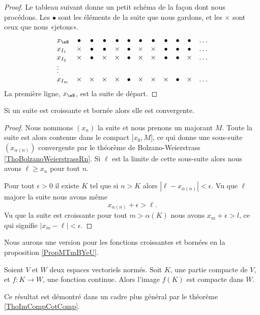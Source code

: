 \begin{proof}
	Le tableau suivant donne un petit schéma de la façon dont nous procédons. Les $\bullet$ sont les éléments de la suite que nous gardons, et les $\times$ sont ceux que nous «jetons».
	\begin{equation}
		\begin{array}{lccccccccccc}
			x_{\eN}	&	\bullet&\bullet&\bullet&\bullet&\bullet&\bullet&\bullet&\bullet&\bullet&\bullet&\ldots\\
			x_{I_1}	&	\times&\bullet&\bullet&\times&\bullet&\times&\times&\bullet&\bullet&\bullet&\ldots\\
			x_{I_2}	&	\times&\bullet&\times&\times&\bullet&\times&\times&\bullet&\bullet&\times&\ldots\\
			\vdots\\
			x_{I_m}	&	\times&\times&\times&\times&\bullet&\times&\times&\times&\bullet&\times&\ldots
		\end{array}
	\end{equation}
	La première ligne, $x_{\eN}$, est la suite de départ.
\end{proof}

\begin{corollary}   \label{CorFHbMqGGyi}
    Si un suite est croissante et bornée alors elle est convergente.
\end{corollary}

\begin{proof}
    Nous nommons \( (x_n)\) la suite et nous prenons un majorant \( M\). Toute la suite est alors contenue dans le compact \( \mathopen[ x_0 , M \mathclose]\), ce qui donne une sous-suite \( (x_{\alpha(n)})\) convergente par le théorème de Bolzano-Weierstrass \ref{ThoBolzanoWeierstrassRn}. Si \( \ell\) est la limite de cette sous-suite alors nous avons \( \ell\geq x_n\) pour tout \( n\). 

    Pour tout \( \epsilon>0\) il existe \( K\) tel que si \( n>K\) alors \( | \ell-x_{\alpha(n)} |<\epsilon\). Vu que \( \ell\) majore la suite nous avons même
    \begin{equation}
        x_{\alpha(n)}+\epsilon>\ell.
    \end{equation}
    Vu que la suite est croissante pour tout \( m>\alpha(K)\) nous avons \( x_m+\epsilon>l\), ce qui signifie \( | x_m-\ell |<\epsilon\).
\end{proof}
Nous aurons une version pour les fonctions croissantes et bornées en la proposition \ref{PropMTmBYeU}.



\begin{proposition}		\label{PropContinueCompactBorne}
	Soient $V$ et $W$ deux espaces vectoriels normés. Soit $K$, une partie compacte de $V$, et $f\colon K\to W$, une fonction continue. Alors l'image $f(K)$ est compacte dans $W$.
\end{proposition}
Ce résultat est démontré dans un cadre plus général par le théorème \ref{ThoImCompCotComp}.

